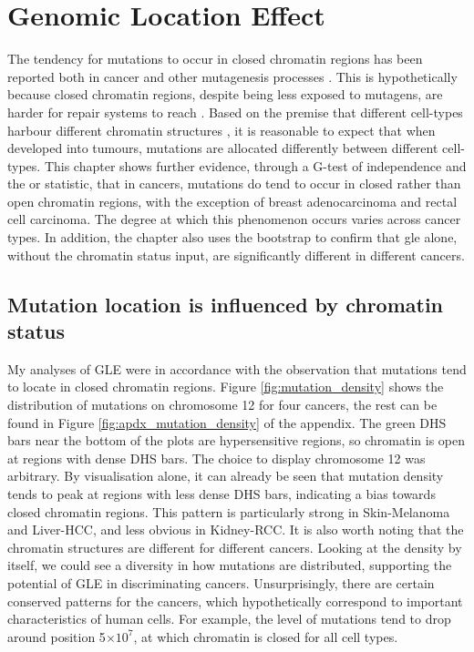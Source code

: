 \chapter{Genomic Location Effect}\label{gle}

The tendency for mutations to occur in closed \gls{chromatin} regions has been reported both in cancer and other mutagenesis processes \citep{Polak2015,Prendergast2007ChromatinGenome}. This is hypothetically because closed chromatin regions, despite being less exposed to mutagens, are harder for repair systems to reach \citep{Prendergast2007ChromatinGenome,Teng1997ExcisionSequences, Morse2002PhotoreactivationCerevisiae}. Based on the premise that different cell-types harbour different chromatin structures \citep{Kundaje2015IntegrativeEpigenomes}, it is reasonable to expect that when developed into tumours, mutations are allocated differently between different cell-types. This chapter shows further evidence, through a G-test of independence and the \gls{or} statistic, that in cancers, mutations do tend to occur in closed rather than open chromatin regions, with the exception of breast adenocarcinoma and rectal cell carcinoma. The degree at which this phenomenon occurs varies across cancer types. In addition, the chapter also uses the \gls{bootstrap} to confirm that \gls{gle} alone, without the chromatin status input, are significantly different in different cancers. 

\section{Mutation location is influenced by chromatin status}
My analyses of GLE were in accordance with the observation that mutations tend to locate in closed chromatin regions. Figure \ref{fig:mutation_density} shows the distribution of mutations on chromosome 12 for four cancers, the rest can be found in Figure \ref{fig:apdx_mutation_density} of the appendix. The green DHS bars near the bottom of the plots are hypersensitive regions, so chromatin is open at regions with dense DHS bars. The choice to display chromosome 12 was arbitrary. By visualisation alone, it can already be seen that mutation density tends to peak at regions with less dense DHS bars, indicating a bias towards closed chromatin regions. This pattern is particularly strong in Skin-Melanoma and Liver-HCC, and less obvious in Kidney-RCC. It is also worth noting that the chromatin structures are different for different cancers. Looking at the density by itself, we could see a diversity in how mutations are distributed, supporting the potential of GLE in discriminating cancers. Unsurprisingly, there are certain conserved patterns for the cancers, which hypothetically correspond to important characteristics of human cells. For example, the level of mutations tend to drop around position 5$\times 10^7$, at which chromatin is closed for all cell types.  

